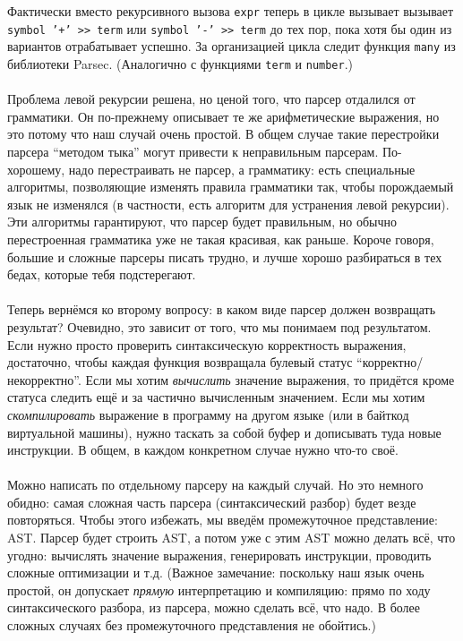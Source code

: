 \documentclass[11pt]{book}
\begin{document}
Фактически вместо рекурсивного вызова \texttt{\footnotesize expr} теперь в цикле вызывает
вызывает \texttt{\footnotesize symbol '+' >\thinspace > term} или \texttt{\footnotesize symbol '-' >\thinspace > term}
до тех пор, пока хотя бы один из вариантов отрабатывает успешно. За организацией цикла следит
функция \texttt{\footnotesize many} из библиотеки Parsec. (Аналогично с функциями 
\texttt{\footnotesize term} и \texttt{\footnotesize number}.)
\\ \\
Проблема левой рекурсии решена, но ценой того, что парсер отдалился от грамматики.
Он по-прежнему описывает те же арифметические выражения, но это потому что наш случай очень простой.
В общем случае такие перестройки парсера ``методом тыка'' могут привести к неправильным парсерам.
По-хорошему, надо перестраивать не парсер, а грамматику: есть специальные алгоритмы, позволяющие изменять правила грамматики так, чтобы 
порождаемый язык не изменялся (в частности, есть алгоритм для устранения левой рекурсии).
Эти алгоритмы гарантируют, что парсер будет правильным, но обычно перестроенная
грамматика уже не такая красивая, как раньше. Короче говоря, большие и сложные парсеры
писать трудно, и лучше хорошо разбираться в тех бедах, которые тебя подстерегают.
\\ \\
Теперь вернёмся ко второму вопросу: в каком виде парсер должен возвращать результат?
Очевидно, это зависит от того, что мы понимаем под результатом. Если нужно просто
проверить синтаксическую корректность выражения, достаточно, чтобы каждая функция
возвращала булевый статус ``корректно/некорректно''.
Если мы хотим \emph{вычислить} значение выражения, то придётся кроме статуса следить
ещё и за частично вычисленным значением. Если мы хотим \emph{скомпилировать} выражение
в программу на другом языке (или в байткод виртуальной машины), нужно таскать за собой
буфер и дописывать туда новые инструкции. В общем, в каждом конкретном случае
нужно что-то своё.
\\ \\
Можно написать по отдельному парсеру на каждый случай. Но это немного обидно:
самая сложная часть парсера (синтаксический разбор) будет везде повторяться.
Чтобы этого избежать, мы введём промежуточное представление: AST. Парсер будет
строить AST, а потом уже с этим AST можно делать всё, что угодно:
вычислять значение выражения, генерировать инструкции, проводить сложные оптимизации и т.д.
(Важное замечание: поскольку наш язык очень простой, он допускает \emph{прямую} интерпретацию
и компиляцию: прямо по ходу синтаксического разбора, из парсера, можно сделать
всё, что надо. В более сложных случаях без промежуточного представления не обойтись.)
\\ \\
\end{document}
